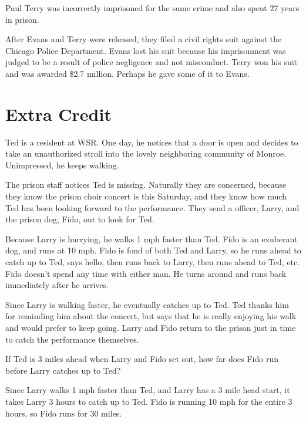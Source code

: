 \documentclass[letterpaper, landscape]{exam}
\begin{document}
\begin{questions}
\begin{parts}
\begin{solution}
            Paul Terry was incorrectly imprisoned for the same crime and also
            spent 27 years in prison.  

            After Evans and Terry were released, they filed a civil rights
            suit against the Chicago Police Department.  Evans lost his suit
            because his imprisonment was judged to be a result of police
            negligence and not misconduct.  Terry won his suit and was awarded
            \$2.7 million.  Perhaps he gave some of it to Evans.

          \end{solution}

      \end{parts}

    \ifprintanswers{}
    \else
      \pagebreak
    \fi

    \section{Extra Credit}

    \question{}

    Ted is a resident at WSR\@.  One day, he notices that a door is open and
    decides to take an unauthorized stroll into the lovely neighboring
    community of Monroe.  Unimpressed, he keeps walking.

    The prison staff notices Ted is missing.  Naturally they are concerned,
    because they know the prison choir concert is this Saturday, and they know
    how much Ted has been looking forward to the performance.  They send a
    officer, Larry, and the prison dog, Fido, out to look for Ted.

    Because Larry is hurrying, he walks 1 mph faster than Ted.  Fido is an
    exuberant dog, and runs at 10 mph.  Fido is fond of both Ted and Larry, so
    he runs ahead to catch up to Ted, says hello, then runs back to Larry, then
    runs ahead to Ted, etc.  Fido doesn't spend any time with either man.  He
    turns around and runs back immediately after he arrives.

    Since Larry is walking faster, he eventually catches up to Ted.  Ted
    thanks him for reminding him about the concert, but says that he is really
    enjoying his walk and would prefer to keep going.  Larry and Fido return
    to the prison just in time to catch the performance themselves.

    If Ted is 3 miles ahead when Larry and Fido set out, how far does Fido run
    before Larry catches up to Ted?

    \begin{solution}
      Since Larry walks 1 mph faster than Ted, and Larry has a 3 mile head
      start, it takes Larry 3 hours to catch up to Ted.  Fido is running 10 mph
      for the entire 3 hours, so Fido runs for 30 miles.
    \end{solution}

  \end{questions}
  \ifprintanswers{}
\end{document}
